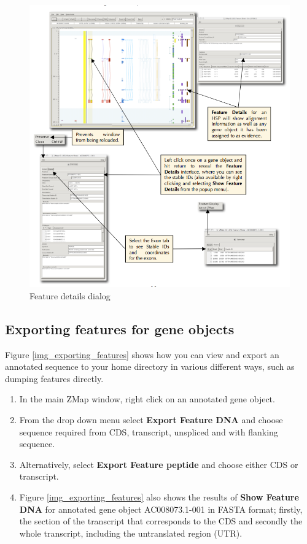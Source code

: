 \documentclass[letterpaper]{article}
\newcounter{Figure}
\begin{document}
\begin{figure}
\centering
\color[rgb]{0.30980393,0.5058824,0.7411765}
\includegraphics[width=15.231cm]{img_feature_details_dialog.png}
\caption{Feature details dialog}
\label{img_feature_details_dialog}
\end{figure}

\subsection{Exporting features for gene objects}
Figure \ref{img_exporting_features} shows how you can view and export an annotated sequence to your home directory in various different ways, such as dumping features directly.
\begin{enumerate}
\item In the main ZMap window, right click on an annotated gene object.
\item From the drop down menu select \textbf{Export Feature DNA} and choose sequence required from CDS, transcript, unspliced and with flanking sequence.
\item Alternatively, select \textbf{Export Feature peptide} and choose either CDS or transcript.
\item Figure \ref{img_exporting_features} also shows the results of \textbf{Show Feature DNA} for annotated gene object AC008073.1-001 in FASTA format; firstly, the section of the transcript that corresponds to the CDS and secondly the whole transcript, including the untranslated region (UTR).
\end{enumerate}
\end{document}
